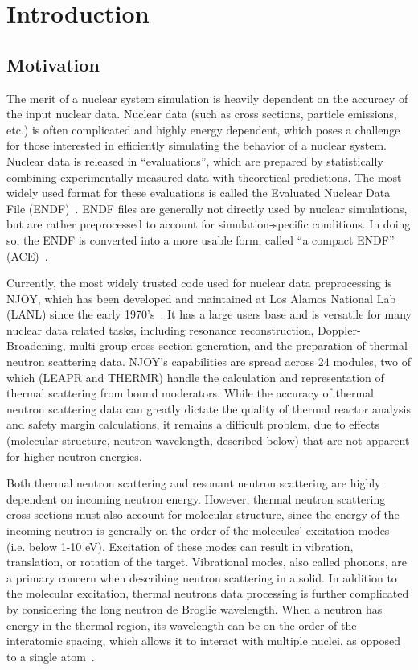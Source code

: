 \documentclass[../master.tex]{subfiles}
\begin{document}
\chapter{Introduction}

	\section{Motivation}\label{sec:motivation}
		The merit of a nuclear system simulation is heavily dependent on the accuracy of the input nuclear data. Nuclear data (such as cross sections, particle emissions, etc.) is often complicated and highly energy dependent, which poses a challenge for those interested in efficiently simulating the behavior of a nuclear system. Nuclear data is released in ``evaluations'', which are prepared by statistically combining experimentally measured data with theoretical predictions. The most widely used format for these evaluations is called the Evaluated Nuclear Data File (ENDF)~\cite{endfManual}. ENDF files are generally not directly used by nuclear simulations, but are rather preprocessed to account for simulation-specific conditions. In doing so, the ENDF is converted into a more usable form, called ``a compact ENDF'' (ACE)~\cite{ace}.\par
		
                Currently, the most widely trusted code used for nuclear data preprocessing is NJOY, which has been developed and maintained at Los Alamos National Lab (LANL) since the early 1970's~\cite{njoy}. It has a large users base and is versatile for many nuclear data related tasks, including resonance reconstruction, Doppler-Broadening, multi-group cross section generation, and the preparation of thermal neutron scattering data. NJOY's capabilities are spread across 24 modules, two of which (LEAPR and THERMR) handle the calculation and representation of thermal scattering from bound moderators. While the accuracy of thermal neutron scattering data can greatly dictate the quality of thermal reactor analysis and safety margin calculations, it remains a difficult problem, due to effects (molecular structure, neutron wavelength, described below) that are not apparent for higher neutron energies. \par

		Both thermal neutron scattering and resonant neutron scattering are highly dependent on incoming neutron energy. However, thermal neutron scattering cross sections must also account for molecular structure, since the energy of the incoming neutron is generally on the order of the molecules' excitation modes (i.e. below 1-10 eV). Excitation of these modes can result in vibration, translation, or rotation of the target. Vibrational modes, also called phonons, are a primary concern when describing neutron scattering in a solid. In addition to the molecular excitation, thermal neutrons data processing is further complicated by considering the long neutron de Broglie wavelength. When a neutron has energy in the thermal region, its wavelength can be on the order of the interatomic spacing, which allows it to interact with multiple nuclei, as opposed to a single atom~\cite{jesseholmes}. 
\end{document}
